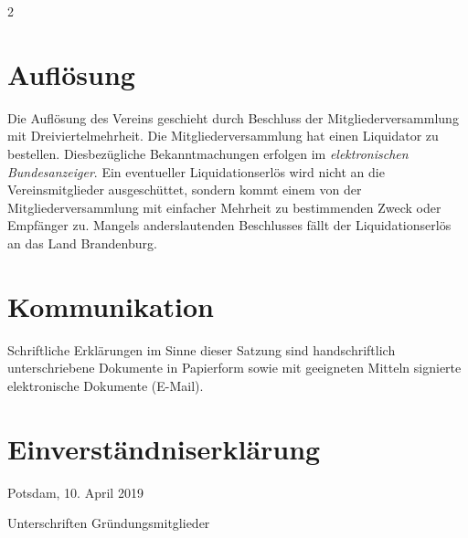 \documentclass[a4paper, 10pt, headings=normal]{scrartcl}
\newenvironment{textinput}[1]%
{%
	\par%
	\vspace{0.75mm}%
	\noindent%
	\linespread{1}%
	\begin{tcolorbox}[colback=light-gray, sharp corners=all, boxrule=0pt, colframe=light-gray, left=1mm, top=0.3mm, bottom=-0.3mm, right=1mm, width=#1]
		\begin{minipage}[t]{\linewidth}%
			\textinputfont\strut%
}%
{%
			\strut%
		\end{minipage}%
	\end{tcolorbox}
	\vspace{0.75mm}%
}
\begin{document}
\begin{multicols}{2}
\section{Auflösung}
\label{par:aufloseung}

Die Auflösung des Vereins geschieht durch Beschluss der Mitgliederversammlung mit Dreiviertelmehrheit.
Die Mitgliederversammlung hat einen Liquidator zu bestellen.
Diesbezügliche Bekanntmachungen erfolgen im \emph{elektronischen Bundesanzeiger}.
Ein eventueller Liquidationserlös wird nicht an die Vereinsmitglieder ausgeschüttet, sondern kommt einem von der Mitgliederversammlung mit einfacher Mehrheit zu bestimmenden Zweck oder Empfänger zu.
Mangels anderslautenden Beschlusses fällt der Liquidationserlös an das Land Brandenburg.

\section{Kommunikation}
\label{par:kommunikation}

Schriftliche Erklärungen im Sinne dieser Satzung sind handschriftlich unterschriebene Dokumente in Papierform sowie mit geeigneten Mitteln signierte elektronische Dokumente (E-Mail).

\end{multicols}

\section*{Einverständniserklärung}

Potsdam, 10. April 2019

\bigskip

\begin{textinput}{\linewidth}%
	Unterschriften Gründungsmitglieder
	\vspace{100mm}%
\end{textinput}%
\end{document}
